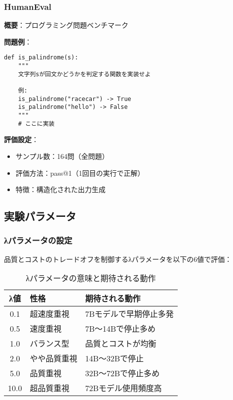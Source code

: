 \documentclass[a4paper,12pt]{jsarticle}
\begin{document}
\subsubsection{HumanEval}

\textbf{概要}：プログラミング問題ベンチマーク

\textbf{問題例}：
\begin{lstlisting}[style=pythonstyle]
def is_palindrome(s):
    """
    文字列sが回文かどうかを判定する関数を実装せよ
    
    例:
    is_palindrome("racecar") -> True
    is_palindrome("hello") -> False
    """
    # ここに実装
\end{lstlisting}

\textbf{評価設定}：
\begin{itemize}
\item サンプル数：164問（全問題）
\item 評価方法：pass@1（1回目の実行で正解）
\item 特徴：構造化された出力生成
\end{itemize}

\subsection{実験パラメータ}

\subsubsection{λパラメータの設定}

品質とコストのトレードオフを制御するλパラメータを以下の6値で評価：

\begin{table}[H]
\centering
\caption{λパラメータの意味と期待される動作}
\begin{tabular}{|c|l|l|}
\hline
\textbf{λ値} & \textbf{性格} & \textbf{期待される動作} \\
\hline
0.1 & 超速度重視 & 7Bモデルで早期停止多発 \\
0.5 & 速度重視 & 7B〜14Bで停止多め \\
1.0 & バランス型 & 品質とコストが均衡 \\
2.0 & やや品質重視 & 14B〜32Bで停止 \\
5.0 & 品質重視 & 32B〜72Bで停止多め \\
10.0 & 超品質重視 & 72Bモデル使用頻度高 \\
\hline
\end{tabular}
\end{table}
\end{document}
